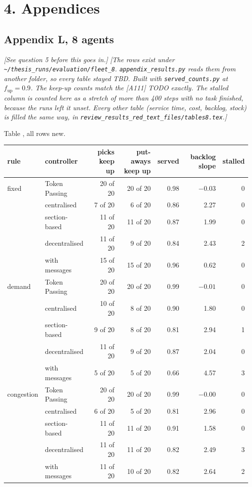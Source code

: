 \documentclass[11pt,a4paper]{article}
\newcommand{\note}[1]{{\small\itshape [#1]}}
\newcommand{\lab}[1]{\textsf{\footnotesize\detokenize{#1}}}
\begin{document}
\section*{4. Appendices}

\subsection*{Appendix L, 8 agents} \note{See question 5 before this goes in.}
\note{The rows exist under \texttt{\textasciitilde/thesis\_runs/evaluation/fleet\_8}.
\texttt{appendix\_results.py} reads them from another folder, so every table
stayed TBD. Built with \texttt{served\_counts.py} at $f_{\mathrm{up}} = 0.9$.
The keep-up counts match the [A111] TODO exactly. The stalled column is
counted here as a stretch of more than 400 steps with no task finished,
because the runs left it unset. Every other table (service time, cost,
backlog, stock) is filled the same way, in
\texttt{review\_results\_red\_text\_files/tables8.tex}.}

Table \lab{tab:app:check}, all rows new.

{\small\setlength{\tabcolsep}{4pt}
\begin{tabular}{llrrrrr}
  \toprule
  rule & controller & picks keep up & put-aways keep up & served & backlog slope & stalled \\
  \midrule
  fixed      & Token Passing & 20 of 20 & 20 of 20 & 0.98 & $-0.03$ & 0 \\
             & centralised   & 7 of 20  & 6 of 20  & 0.86 & 2.27 & 0 \\
             & section-based & 11 of 20 & 11 of 20 & 0.87 & 1.99 & 0 \\
             & decentralised & 11 of 20 & 9 of 20  & 0.84 & 2.43 & 2 \\
             & with messages & 15 of 20 & 15 of 20 & 0.96 & 0.62 & 0 \\
  demand     & Token Passing & 20 of 20 & 20 of 20 & 0.99 & $-0.01$ & 0 \\
             & centralised   & 10 of 20 & 8 of 20  & 0.90 & 1.80 & 0 \\
             & section-based & 9 of 20  & 8 of 20  & 0.81 & 2.94 & 1 \\
             & decentralised & 11 of 20 & 9 of 20  & 0.87 & 2.04 & 0 \\
             & with messages & 5 of 20  & 5 of 20  & 0.66 & 4.57 & 3 \\
  congestion & Token Passing & 20 of 20 & 20 of 20 & 0.99 & $-0.00$ & 0 \\
             & centralised   & 6 of 20  & 5 of 20  & 0.81 & 2.96 & 0 \\
             & section-based & 11 of 20 & 11 of 20 & 0.91 & 1.58 & 0 \\
             & decentralised & 11 of 20 & 11 of 20 & 0.82 & 2.49 & 3 \\
             & with messages & 11 of 20 & 10 of 20 & 0.82 & 2.64 & 2 \\
  \bottomrule
\end{tabular}}
\end{document}
